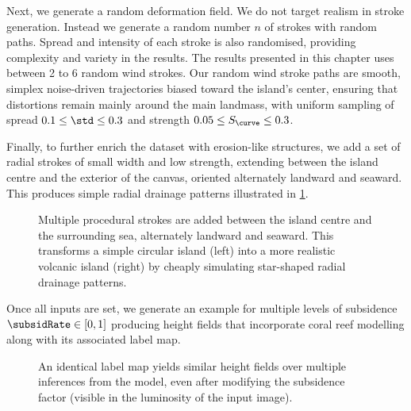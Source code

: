 Next, we generate a random deformation field. We do not target realism in stroke generation. Instead we generate a random number $n$ of strokes with random paths. Spread and intensity of each stroke is also randomised, providing complexity and variety in the results. The results presented in this chapter uses between 2 to 6 random wind strokes. Our random wind stroke paths are smooth, simplex noise-driven trajectories biased toward the island's center, ensuring that distortions remain mainly around the main landmass, with uniform sampling of spread $0.1 \leq \std \leq 0.3$ and strength $0.05 \leq S_\curve \leq 0.3$.

Finally, to further enrich the dataset with erosion-like structures, we add a set of radial strokes of small width and low strength, extending between the island centre and the exterior of the canvas, oriented alternately landward and seaward. This produces simple radial drainage patterns illustrated in \cref{fig:coral-island-radial-pattern-example}.

\begin{figure}
    \caption[Radial drainage inserted in our dataset generation]{Multiple procedural strokes are added between the island centre and the surrounding sea, alternately landward and seaward. This transforms a simple circular island (left) into a more realistic volcanic island (right) by cheaply simulating star-shaped radial drainage patterns.}
    \label{fig:coral-island-radial-pattern-example}
\end{figure}

Once all inputs are set, we generate an example for multiple levels of subsidence $\subsidRate \in [0, 1]$ producing height fields that incorporate coral reef modelling along with its associated label map.

\begin{figure}
    \caption[Multiple islands generated with two subsidence values]{An identical label map yields similar height fields over multiple inferences from the model, even after modifying the subsidence factor (visible in the luminosity of the input image).}
    \label{fig:coral-island-results-subsidence}
\end{figure}

